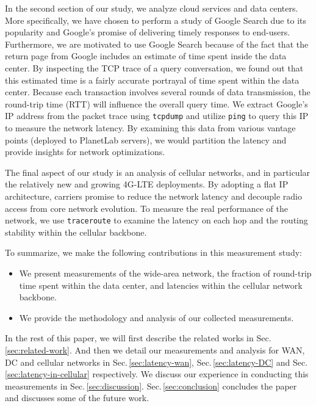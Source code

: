 In the second section of our study, we analyze cloud services and data centers. More specifically, we have chosen to perform a study of Google Search due to its popularity and Google's promise of delivering timely responses to end-users. Furthermore, we are motivated to use Google Search because of the fact that the return page from Google includes an estimate of time spent inside the data center. By inspecting the TCP trace of a query conversation, we found out that this estimated time is a fairly accurate portrayal of time spent within the data center. Because each transaction involves several rounds of data transmission, the round-trip time (RTT) will influence the overall query time. We extract Google's IP address from the packet trace using \texttt{tcpdump} and utilize \texttt{ping} to query this IP to measure the network latency. By examining this data from various vantage points (deployed to PlanetLab servers), we would partition the latency and provide insights for network optimizations.

The final aspect of our study is an analysis of cellular networks, and in particular the relatively new and growing 4G-LTE deployments. By adopting a flat IP architecture, carriers promise to reduce the network latency and decouple radio access from core network evolution. To measure the real performance of the network, we use \texttt{traceroute} to examine the latency on each hop and the routing stability within the cellular backbone.

To summarize, we make the following contributions in this measurement study:
\begin{itemize}
\setlength{\itemsep}{1pt}
\setlength{\parskip}{0pt}
\setlength{\parsep}{0pt}
\item We present measurements of the wide-area network, the fraction of round-trip time spent within the data center, and latencies within the cellular network backbone.
\item We provide the methodology and analysis of our collected measurements.
\end{itemize}

In the rest of this paper, we will first describe the related works in Sec.\,\ref{sec:related-work}. And then we detail our measurements and analysis for WAN, DC and cellular networks in Sec.\,\ref{sec:latency-wan}, Sec.\,\ref{sec:latency-DC} and Sec.\,\ref{sec:latency-in-cellular} respectively. We discuss our experience in conducting this measurements in Sec.\,\ref{sec:discussion}. Sec.\,\ref{sec:conclusion} concludes the paper and discusses some of the future work.


